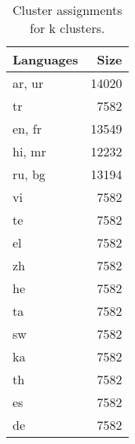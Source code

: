 \begin{table}
\caption{Cluster assignments for {k} clusters.}
\label{tab:chung_clusters_k16}
\begin{tabular}{lr}
\toprule
Languages & Size \\
\midrule
ar, ur & 14020 \\
tr & 7582 \\
en, fr & 13549 \\
hi, mr & 12232 \\
ru, bg & 13194 \\
vi & 7582 \\
te & 7582 \\
el & 7582 \\
zh & 7582 \\
he & 7582 \\
ta & 7582 \\
sw & 7582 \\
ka & 7582 \\
th & 7582 \\
es & 7582 \\
de & 7582 \\
\bottomrule
\end{tabular}
\end{table}
